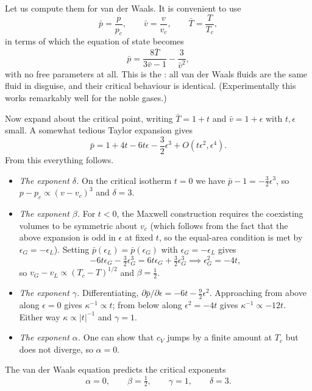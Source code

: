 Let us compute them for van der Waals. It is convenient to use 
$$
\bar p = \frac{p}{p_c}, \qquad \bar v = \frac{v}{v_c}, \qquad \bar T = \frac{T}{T_c},
$$
in terms of which the equation of state becomes
$$
\bar p = \frac{8\bar T}{3\bar v - 1} - \frac{3}{\bar v^2},
$$
with no free parameters at all. This is the : all van der Waals fluids are the same fluid in disguise, and their critical behaviour is identical. (Experimentally this works remarkably well for the noble gases.)

Now expand about the critical point, writing $\bar T = 1+t$ and $\bar v = 1 + \epsilon$ with $t, \epsilon$ small. A somewhat tedious Taylor expansion gives
$$
\bar p = 1 + 4t - 6t\epsilon - \frac 32 \epsilon^3 + O(t\epsilon^2, \epsilon^4).
$$
From this everything follows.

\begin{itemize}
	\item \emph{The exponent $\delta$.} On the critical isotherm $t = 0$ we have $\bar p - 1 = -\tfrac32 \epsilon^3$, so $p - p_c \propto (v-v_c)^3$ and $\delta = 3$.
	\item \emph{The exponent $\beta$.} For $t< 0$, the Maxwell construction requires the coexisting volumes to be symmetric about $v_c$ (which follows from the fact that the above expansion is odd in $\epsilon$ at fixed $t$, so the equal-area condition is met by $\epsilon_G = -\epsilon_L$). Setting $\bar p(\epsilon_L) = \bar p(\epsilon_G)$ with $\epsilon_G = -\epsilon_L$ gives
	$$
	-6t\epsilon_G - \tfrac 32\epsilon_G^3 = 6t\epsilon_G + \tfrac 32 \epsilon_G^3 \implies \epsilon_G^2 = -4t,
	$$
	so $v_G - v_L \propto (T_c - T)^{1/2}$ and $\beta = \tfrac 12$.
	\item \emph{The exponent $\gamma$.} Differentiating, $\partial\bar p/\partial \epsilon = -6t - \tfrac 92\epsilon^2$. Approaching from above along $\epsilon = 0$ gives $\kappa^{-1} \propto t$; from below along $\epsilon^2 = -4t$ gives $\kappa^{-1}\propto -12 t$. Either way $\kappa \propto |t|^{-1}$ and $\gamma = 1$.
	\item \emph{The exponent $\alpha$.} One can show that $c_V$ jumps by a finite amount at $T_c$ but does not diverge, so $\alpha = 0$.
\end{itemize}

\begin{proposition}
	The van der Waals equation predicts the critical exponents
	$$
	\alpha = 0, \qquad \beta = \tfrac 12, \qquad \gamma = 1, \qquad \delta = 3.
	$$
\end{proposition}

